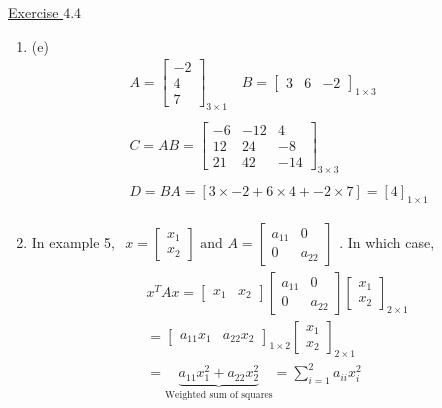 \underline{Exercise $4.4$}

\begin{enumerate}
\item[5.] (e)  \[ \begin{aligned}
 & A=\left[\begin{array}{c}
-2 \\
4 \\
7
\end{array}\right]_{3 \times 1} \quad B=\left[\begin{array}{lll}
3 & 6 & -2
\end{array}\right]_{1 \times 3} \\~\\
& C=A B=\left[\begin{array}{ccc}
-6 & -12 & 4 \\
12 & 24 & -8 \\
21 & 42 & -14
\end{array}\right]_{3 \times 3} \\~\\
& D=B A=[3 \times-2+6 \times 4+-2 \times 7]=[4]_{1 \times 1}
\end{aligned} \]

\item[7.] In example 5, $
\begin{aligned} x=\left[\begin{array}{l}x_{1} \\x_{2}\end{array}\right] \text{ and }A=\left[\begin{array}{cc}a_{11} & 0 \\0 & a_{22}\end{array}\right] \end{aligned} $.
In which case,
\[
\begin{aligned}
& x^T A x=\left[\begin{array}{ll}x_{1} & x_{2}\end{array}\right]\left[\begin{array}{cc}a_{11} & 0 \\0 & a_{22}\end{array}\right]\left[\begin{array}{l}x_{1} \\x_{2}\end{array}\right]_{2 \times 1} \\
& =\left[\begin{array}{lll}a_{11} x_{1} & a_{22} x_{2}\end{array}\right]_{1 \times 2}\left[\begin{array}{l}x_{1} \\x_{2}\end{array}\right]_{2 \times 1} \\
& =\underbrace{a_{11} x_{1}^{2}+a_{22} x_{2}^{2}}_{\text{Weighted sum of squares}}=\sum_{i=1}^{2} a_{i i} x_{i}^{2}
\end{aligned}
\]


\end{enumerate}

